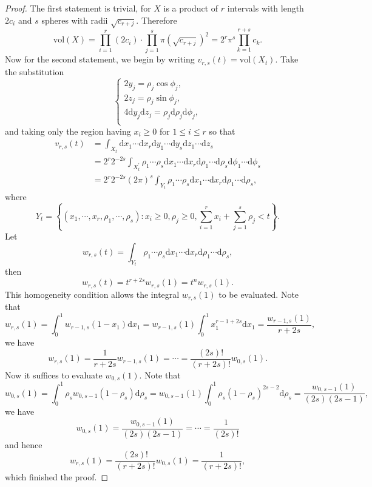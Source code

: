 \begin{proof}
The first statement is trivial, for $X$ is a product of $r$ intervals with length $2c_i$ and $s$ spheres with radii $\sqrt{c_{r+j}}$. Therefore 
$$
\mathrm{vol}\left( X \right) =\prod_{i=1}^r{\left( 2c_i \right)}\cdot \prod_{j=1}^s{\pi \left( \sqrt{c_{r+j}} \right) ^2}=2^r\pi ^s\prod_{k=1}^{r+s}{c_k}.
$$
Now for the second statement, we begin by writing $v_{r,s}(t)=\mathrm{vol}(X_t)$. Take the substitution 
$$
\begin{cases}
	2y_j=\rho _j\cos \phi _j,\\
	2z_j=\rho _j\sin \phi _j,\\
	4\mathrm{d}y_j\mathrm{d}z_j=\rho _j\mathrm{d}\rho _j\mathrm{d}\phi _j,\\
\end{cases}
$$
and taking only the region having $x_i\ge 0$ for $1\le i\le r$ so that 
$$
\begin{aligned}
v_{r,s}\left( t \right) &=\int_{X_t}{\mathrm{d}x_1\cdots \mathrm{d}x_r\mathrm{d}y_1\cdots \mathrm{d}y_s\mathrm{d}z_1\cdots \mathrm{d}z_s}
\\
&=2^r2^{-2s}\int_{X_{t}^{\prime}}{\rho _1\cdots \rho _s\mathrm{d}x_1\cdots \mathrm{d}x_r\mathrm{d}\rho _1\cdots \mathrm{d}\rho _s\mathrm{d}\phi _1\cdots \mathrm{d}\phi _s}
\\
&=2^r2^{-2s}\left( 2\pi \right) ^s\int_{Y_t}{\rho _1\cdots \rho _s\mathrm{d}x_1\cdots \mathrm{d}x_r\mathrm{d}\rho _1\cdots \mathrm{d}\rho _s},
\end{aligned}
$$
where 
$$
Y_t=\left\{ \left( x_1,\cdots ,x_r,\rho _1,\cdots ,\rho _s \right) :x_i\ge 0,\rho _j\ge 0,\sum_{i=1}^r{x_i}+\sum_{j=1}^s{\rho _j}<t \right\} .
$$
Let 
$$
w_{r,s}\left( t \right) =\int_{Y_t}{\rho _1\cdots \rho _s\mathrm{d}x_1\cdots \mathrm{d}x_r\mathrm{d}\rho _1\cdots \mathrm{d}\rho _s},
$$
then 
$$
w_{r,s}\left( t \right) =t^{r+2s}w_{r,s}\left( 1 \right) =t^nw_{r,s}\left( 1 \right) .
$$
This homogeneity condition allows the integral $w_{r,s}(1)$ to be evaluated. Note that 
$$
w_{r,s}\left( 1 \right) =\int_0^1{w_{r-1,s}\left( 1-x_1 \right) \mathrm{d}x_1}=w_{r-1,s}\left( 1 \right) \int_0^1{x_{1}^{r-1+2s}\mathrm{d}x_1}=\frac{w_{r-1,s}\left( 1 \right)}{r+2s},
$$
we have 
$$
w_{r,s}\left( 1 \right) =\frac{1}{r+2s}w_{r-1,s}\left( 1 \right) =\cdots =\frac{\left( 2s \right) !}{\left( r+2s \right) !}w_{0,s}\left( 1 \right) .
$$
Now it suffices to evaluate $w_{0,s}(1)$. Note that 
$$
w_{0,s}\left( 1 \right) =\int_0^1{\rho _sw_{0,s-1}\left( 1-\rho _s \right) \mathrm{d}\rho _s}=w_{0,s-1}\left( 1 \right) \int_0^1{\rho _s\left( 1-\rho _s \right) ^{2s-2}\mathrm{d}\rho _s}=\frac{w_{0,s-1}\left( 1 \right)}{\left( 2s \right) \left( 2s-1 \right)},
$$
we have 
$$
w_{0,s}\left( 1 \right) =\frac{w_{0,s-1}\left( 1 \right)}{\left( 2s \right) \left( 2s-1 \right)}=\cdots =\frac{1}{\left( 2s \right) !}
$$
and hence 
$$
w_{r,s}\left( 1 \right) =\frac{\left( 2s \right) !}{\left( r+2s \right) !}w_{0,s}\left( 1 \right) =\frac{1}{\left( r+2s \right) !},
$$
which finished the proof.
\end{proof}
